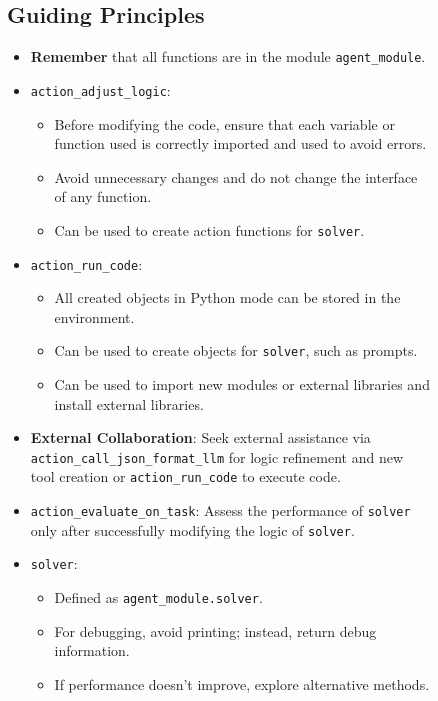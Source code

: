 \documentclass[11pt]{article}
\newcommand{\framework}{Gödel Agent\xspace}
\begin{document}
\begin{figure}[ht]
\begin{tcolorbox}[colback=black!15!white, colframe=black, title=Goal Prompt of \framework]
\subsection*{\textbf{Guiding Principles}}

\begin{itemize}[leftmargin=*,itemsep=1pt]
    \item \textbf{Remember} that all functions are in the module \texttt{agent\_module}.
    \item \texttt{action\_adjust\_logic}:
    \begin{itemize}[leftmargin=*,itemsep=2pt]
        \item Before modifying the code, ensure that each variable or function used is correctly imported and used to avoid errors.
        \item Avoid unnecessary changes and do not change the interface of any function.
        \item Can be used to create action functions for \texttt{solver}.
    \end{itemize}
    \item \texttt{action\_run\_code}:
    \begin{itemize}[leftmargin=*,itemsep=2pt]
        \item All created objects in Python mode can be stored in the environment.
        \item Can be used to create objects for \texttt{solver}, such as prompts.
        \item Can be used to import new modules or external libraries and install external libraries.
    \end{itemize}
    \item \textbf{External Collaboration}: Seek external assistance via \texttt{action\_call\_json\_format\_llm} for logic refinement and new tool creation or \texttt{action\_run\_code} to execute code.
    \item \texttt{action\_evaluate\_on\_task}: Assess the performance of \texttt{solver} only after successfully modifying the logic of \texttt{solver}.
    \item \texttt{solver}:
    \begin{itemize}[leftmargin=*,itemsep=1pt]
        \item Defined as \texttt{agent\_module.solver}.
        \item For debugging, avoid printing; instead, return debug information.
        \item If performance doesn't improve, explore alternative methods.

\end{itemize}
\end{itemize}
\end{tcolorbox}
\end{figure}
\end{document}
